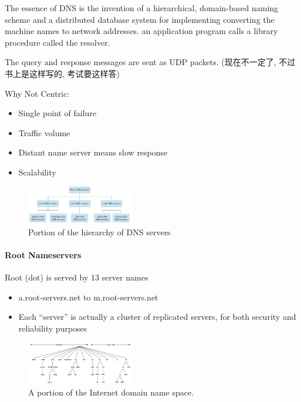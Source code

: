 The essence of DNS is the invention of a hierarchical, domain-based naming scheme and a distributed database system for implementing converting the machine names to network addresses. an application program calls a library procedure called the resolver. 

The query and response messages are sent as UDP packets. (现在不一定了, 不过书上是这样写的, 考试要这样答)

Why Not Centric:
\begin{itemize}
    \item Single point of failure
    \item Traffic volume
    \item Distant name server means slow response
    \item Scalability
\end{itemize}

\begin{figure}[!htb]
    \centering
    \includegraphics[width=0.42\textwidth]{pic/CN7/Portion of the hierarchy of DNS servers}
    \caption{Portion of the hierarchy of DNS servers}
\end{figure}


\paragraph{Root Nameservers}Root (dot) is served by 13 server names
\begin{itemize}
    \item a.root-servers.net to m.root-servers.net
    \item Each ``server'' is actually a cluster of replicated servers, for both security and reliability purposes
\end{itemize}

\begin{figure}[!htb]
    \centering
    \includegraphics[width=0.42\textwidth]{pic/CN7/A portion of the Internet domain name space.}
    \caption{A portion of the Internet domain name space.}
\end{figure}

